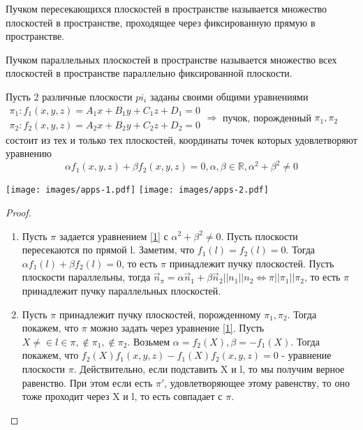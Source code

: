 \begin{definition}
	Пучком пересекающихся плоскостей в пространстве называется множество плоскостей в пространстве, проходящее через фиксированную прямую в пространстве.
\end{definition}
\begin{definition}
	Пучком параллельных плоскостей в пространстве называется множество всех плоскостей в пространстве параллельно фиксированной плоскости.
\end{definition}
\begin{theorem}
	Пусть 2 различные плоскости \(pi_i\) заданы своими общими уравнениями\newline
	\(\begin{gathered}
		\pi_1: f_1(x,y,z) = A_1x+B_1y+C_1z+D_1 = 0\\
		\pi_2: f_2(x,y,z) = A_2x+B_2y+C_2z+D_2 = 0
	\end{gathered}\Longrightarrow\) пучок, порожденный \(\pi_1, \pi_2\) состоит из тех и только тех плоскостей, координаты точек которых удовлетворяют уравнению
	\begin{equation}\label{1}
		\alpha f_1(x,y,z)+\beta f_2(x,y,z) = 0, \alpha, \beta \in \mathbb{R}, \alpha^2+\beta^2\ne0
	\end{equation}
\end{theorem}

\vspace{.7cm}
\hfill \texttt{[image: images/apps-1.pdf]} \hfill	\texttt{[image: images/apps-2.pdf]} \hfill 
\vspace{.7cm}

\begin{proof}
	\begin{enumerate}
		\item Пусть $\pi$ задается уравнением \ref{1} с \(\alpha^2+\beta^2\ne0\). \newline Пусть плоскости пересекаются по прямой l. Заметим, что \(f_1(l) = f_2(l) = 0\). Тогда $\alpha f_1(l) + \beta f_2(l) = 0$, то есть $\pi$ принадлежит пучку плоскостей. \newline
		Пусть плоскости параллельны, тогда \(\vec n_\pi = \alpha\vec n_1 + \beta\vec n_2 || n_1 || n_2\Longleftrightarrow \pi || \pi_1 || \pi_2\), то есть $\pi$ принадлежит пучку параллельных плоскостей.
		\item Пусть $\pi$ принадлежит пучку плоскостей, порожденному $\pi_1, \pi_2$. Тогда покажем, что $\pi$ можно задать через уравнение \ref{1}. Пусть \(X\ne\in l\in \pi, \not\in \pi_1,\not\in\pi_2\). Возьмем \(\alpha=f_2(X), \beta = -f_1(X)\). Тогда покажем, что \(f_2(X)f_1(x,y,z) -f_1(X)f_2(x,y,z) = 0\) - уравнение плоскости $\pi$. Действительно, если подставить X и l, то мы получим верное равенство. При этом если есть $\pi'$, удовлетворяющее этому равенству, то оно тоже проходит через X и l, то есть совпадает с $\pi$.
	\end{enumerate}
\end{proof}

